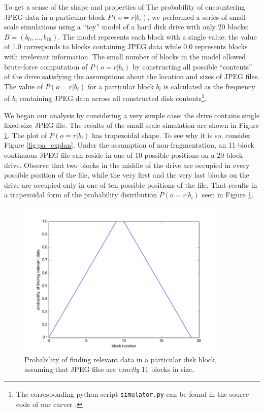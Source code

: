 \documentclass[final,5p,times,twocolumn,authoryear]{elsarticle}
\begin{document}
To get a sense of the shape and properties of The probability of encountering JPEG  data in a particular block $P(o=r | b_i)$, we performed a series of small-scale simulations using a ``toy'' model of a hard disk drive with only 20 blocks: $B=(b_0,\dots,b_{19})$. The model represents each block with a single value: the value of 1.0 corresponds to blocks containing JPEG data while 0.0 represents blocks with irrelevant information. The small number of blocks in the model allowed brute-force computation of $P(o=r | b_i)$ by constructing all possible ``contents'' of the drive satisfying the assumptions about the location and sizes of JPEG files. The value of  $P(o=r | b_i)$ for a particular block $b_i$ is calculated as the frequency of $b_i$ containing JPEG data across all constructed disk contents\footnote{The corresponding python script \texttt{simulator.py} can be found in the source code of our carver \citep{gladyshevjames2015}.}.

We began our analysis by considering a very simple case: the drive contains single fixed-size JPEG file. The results of the small scale simulation are shown in Figure \ref{fig:fig-20blk-11min-11max2d}. The plot of $P(o=r|b_i)$ has trapezoidal shape. To see why it is so, consider Figure \ref{fig:pa_explan}. Under the assumption of non-fragmentation, an 11-block continuous JPEG file can reside in one of 10 possible positions on a 20-block drive. Observe that two blocks in the middle of the drive are occupied in every possible position of the file, while the very first and the very last blocks on the drive are occupied only in one of ten possible positions of the file. That results in a trapezoidal form of the probability distribution $P(o=r|b_i)$ seen in Figure \ref{fig:fig-20blk-11min-11max2d}.

\begin{figure}
  \centerline{\includegraphics[width=0.9\textwidth]{fig-20blk-11min-11max2d}}
  \caption{Probability of finding relevant data in a particular disk block, assuming that JPEG files are \emph{exactly} 11 blocks in size.}
  \label{fig:fig-20blk-11min-11max2d}
\end{figure}
\end{document}
